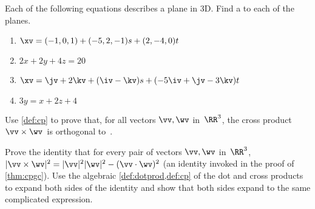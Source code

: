 \begin{exercise}  
Each of the following equations describes a plane in 3D.
Find a  to each of the planes.
\begin{enumerate}
\item \(\xv=(-1,0,1)+(-5,2,-1)s+(2,-4,0)t\)

\item \(2x+2y+4z=20\)


\item \(\xv=\jv+2\kv+(\iv-\kv)s+(-5\iv+\jv-3\kv)t\)
\answer{\(\propto\iv+8\jv+\kv\)}

\item \(3y=x+2z+4\)
\answer{\(\propto -\iv+3\jv-2\kv\)}


\end{enumerate}
\end{exercise}







\begin{exercise} \label{ex:cpga} 
Use \cref{def:cp} to prove that, for all vectors \(\vv,\wv\) in~\(\RR^3\), the cross product~\(\vv\times\wv\)~is orthogonal to~\wv.
\end{exercise}




\begin{exercise} \label{ex:cpgc} 
Prove the identity that for every pair of vectors \(\vv,\wv\) in~\(\RR^3\), \(|\vv\times\wv|^2=|\vv|^2|\wv|^2-(\vv\cdot\wv)^2\) (an identity invoked in the proof of \cref{thm:cpgc}). 
Use the algebraic \cref{def:dotprod,def:cp} of the dot and cross products to expand both sides of the identity and show that both sides expand to the same complicated expression.
\end{exercise}




